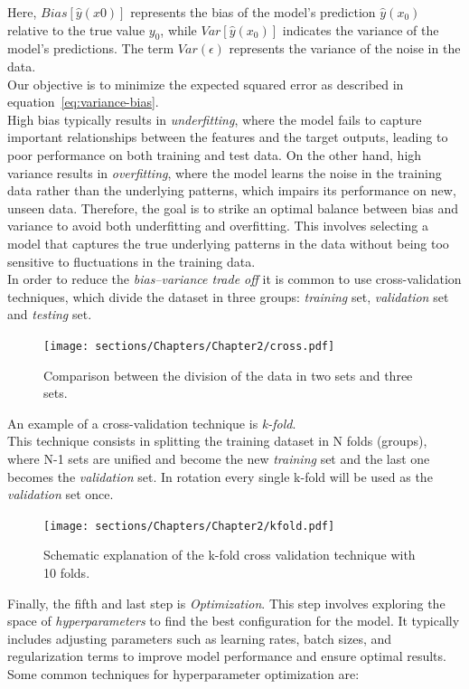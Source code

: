 Here, $Bias[\hat{y}(x0)]$ represents the bias of the model's prediction $\hat{y}(x_0)$ relative to the true value $y_0$, while 
$Var[\hat{y}(x_0)]$ indicates the variance of the model's predictions. The term $Var(\epsilon)$ represents the variance of the noise in the data.\\
Our objective is to minimize the expected squared error as described in equation~\ref{eq:variance-bias}.\\
High bias typically results in \textit{underfitting}, where the model fails to capture important relationships between the 
features and the target outputs, leading to poor performance on both training and test data. On the other hand, high 
variance results in \textit{overfitting}, where the model learns the noise in the training data rather than 
the underlying patterns, which impairs its performance on new, unseen data.
Therefore, the goal is to strike an optimal balance between bias and variance to avoid both underfitting and overfitting. 
This involves selecting a model that captures the true underlying patterns in the data without being too sensitive to fluctuations 
in the training data.\\
In order to reduce the \textit{bias–variance trade off} it is common to use cross-validation techniques, 
which divide the dataset in three groups: \textit{training} set, \textit{validation} set and \textit{testing} set.

\begin{figure}[h]
\centering
\texttt{[image: sections/Chapters/Chapter2/cross.pdf]}
\caption{Comparison between the division of the data in two sets and three sets.}
\end{figure}

An example of a cross-validation technique is \textit{k-fold}.\\
This technique consists in splitting the training dataset in N folds (groups), where N-1 sets are unified and become the new \textit{training} set 
and the last one becomes the \textit{validation} set.
In rotation every single k-fold will be used as the \textit{validation} set once.\\

\begin{figure}[h]
\centering
\texttt{[image: sections/Chapters/Chapter2/kfold.pdf]}
\caption{Schematic explanation of the k-fold cross validation technique with 10 folds.}
\end{figure}


Finally, the fifth and last step is \textit{Optimization}. This step involves exploring the space of \textit{hyperparameters} to find the best 
configuration for the model. It typically includes adjusting parameters such as learning rates, batch sizes, and regularization terms to improve 
model performance and ensure optimal results.\\
Some common techniques for hyperparameter optimization are:

